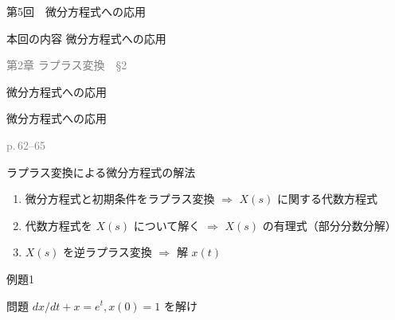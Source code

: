 \documentclass[aspectratio=43,professionalfonts,handout]{beamer}
\begin{document}
\begin{frame}{第5回　微分方程式への応用}
  \begin{block}{本回の内容}
  微分方程式への応用
  \end{block}
  \vfill\hfill{\scriptsize \textcolor{gray}{第2章 ラプラス変換　§2}}
\end{frame}

\begin{frame}{微分方程式への応用}
  \begin{block}{}
  {\large 微分方程式への応用}
  \end{block}
  \vfill\hfill{\scriptsize \textcolor{gray}{p.\,62--65}}
\end{frame}

\begin{frame}{ラプラス変換による微分方程式の解法}
  \begin{block}{}
  \begin{enumerate}[Step 1.]
    \item 微分方程式と初期条件をラプラス変換
    $\Rightarrow$ $X(s)$ に関する代数方程式\\
    \item 代数方程式を $X(s)$ について解く
    $\Rightarrow$ $X(s)$ の有理式（部分分数分解）\\
    \item $X(s)$ を逆ラプラス変換
    $\Rightarrow$ 解 $x(t)$\\
  \end{enumerate}
  \end{block}
\end{frame}

\begin{frame}{例題1}
  \begin{exampleblock}{問題}
    $dx/dt + x = e^t, x(0) = 1$ を解け\\[2pt]
  \end{exampleblock}
\end{frame}
\end{document}
